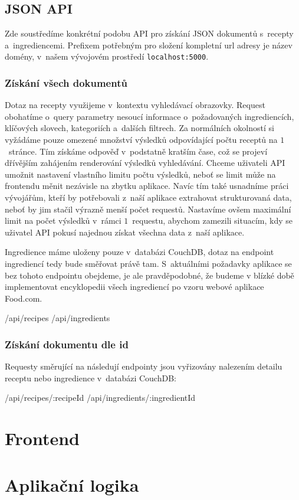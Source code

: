 \subsection{JSON API}

Zde soustředíme konkrétní podobu API pro získání JSON dokumentů s~recepty a~ingrediencemi. Prefixem potřebným pro složení kompletní url adresy je název domény, v~našem vývojovém prostředí \texttt{localhost:5000}.

\subsubsection{Získání všech dokumentů}

Dotaz na recepty využijeme v~kontextu vyhledávací obrazovky. Request obohatíme o~query parametry nesoucí informace o~požadovaných ingrediencích, klíčových slovech, kategoriích a~dalších filtrech. Za normálních okolností si vyžádáme pouze omezené množství výsledků odpovídající počtu receptů na $1$~stránce. Tím získáme odpověď v~podstatně kratším čase, což se projeví dřívějším zahájením renderování výsledků vyhledávání. Chceme uživateli API umožnit nastavení vlastního limitu počtu výsledků, neboť se limit může na frontendu měnit nezávisle na zbytku aplikace. Navíc tím také usnadníme práci vývojářům, kteří by potřebovali z~naší aplikace extrahovat strukturovaná data, neboť by jim stačil výrazně menší počet requestů. Nastavíme ovšem maximální limit na počet výsledků v~rámci $1$~requestu, abychom zamezili situacím, kdy se uživatel API pokusí najednou získat všechna data z~naší aplikace.

Ingredience máme uloženy pouze v~databázi CouchDB, dotaz na endpoint ingrediencí tedy bude směřovat právě tam. S~aktuálními požadavky aplikace se bez tohoto endpointu obejdeme, je ale pravděpodobné, že budeme v blízké době implementovat encyklopedii všech ingrediencí po vzoru webové aplikace Food.com.

\begin{code}
/api/recipes
/api/ingredients
\end{code}

\subsubsection{Získání dokumentu dle id}

Requesty směrující na následují endpointy jsou vyřizovány nalezením detailu receptu nebo ingredience v~databázi CouchDB:

\begin{code}
/api/recipes/:recipeId
/api/ingredients/:ingredientId
\end{code}

\section{Frontend}


\section{Aplikační logika}